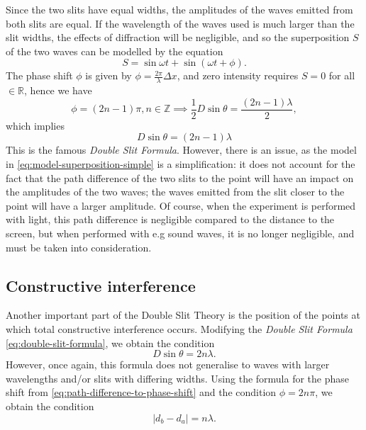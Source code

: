 \documentclass{paper}
\begin{document}
Since the two slits have equal widths, the amplitudes of the waves emitted from both
slits are equal. If the wavelength of the waves used is much larger than the slit widths,
the effects of diffraction will be negligible, and so the superposition $S$ of the two waves can be modelled by 
the equation 
\begin{equation}
    \label{eq:model-superposition-simple}
    S = \sin{\omega{}t} + \sin(\omega{}t + \phi).
\end{equation}
 The phase shift $\phi$ is given
by $\phi = \frac{2\pi}{\lambda}\Delta{x}$, and zero intensity requires $S = 0$ for all $\in\mathbb{R}$,
hence we have 
\begin{equation*}
    \phi = (2n-1)\pi, n\in\mathbb{Z} \implies \frac{1}{2}D\sin{\theta} = \frac{(2n-1)\lambda}{2},
\end{equation*}
which implies 
\begin{equation}
    \label{eq:double-slit-formula}
    D\sin{\theta} = (2n-1)\lambda
\end{equation}
This is the famous \textit{Double Slit Formula}. However, there is an issue,
as the model in \eqref{eq:model-superposition-simple} is a simplification: it does not account for the fact that the path difference of the two slits
to the point will have an impact on the amplitudes of the two waves; the waves emitted
from the slit closer to the point will have a larger amplitude. Of course, when the
experiment is performed with light, this path difference is negligible compared to
the distance to the screen, but when performed with e.g sound waves, it is no longer
negligible, and must be taken into consideration. 

\subsection{Constructive interference}
Another important part of the Double Slit Theory is the position of the
points at which total constructive interference occurs. Modifying the 
\textit{Double Slit Formula} \eqref{eq:double-slit-formula}, we obtain
the condition 
\begin{equation}
    D\sin{\theta} = 2n\lambda.
\end{equation}
However, once again, this formula does not generalise to waves with larger wavelengths
and/or slits with differing widths. Using the formula for the phase shift from \eqref{eq:path-difference-to-phase-shift}
and the condition $\phi = 2n\pi$, we obtain the condition
\begin{equation}
    \label{eq:condition-constructive-interference}
    \lvert{}d_{b} - d_{a}\rvert = n\lambda.
\end{equation}
\end{document}
